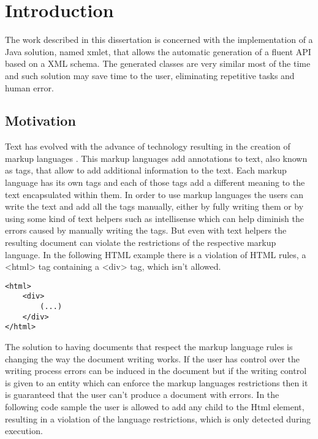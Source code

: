 \chapter{Introduction}
\label{cha:introduction}

The work described in this dissertation is concerned with the implementation of a Java solution, named xmlet, that allows the automatic generation of a fluent API based on a XML schema. The generated classes are very similar most of the time and such solution may save time to the user, eliminating repetitive tasks and human error.

\section{Motivation}


Text has evolved with the advance of technology resulting in the creation of markup languages \cite{markuplanguages}. This markup languages add annotations to text, also known as tags, that allow to add additional information to the text. Each markup language has its own tags and each of those tags add a different meaning to the text encapsulated within them. In order to use markup languages the users can write the text and add all the tags manually, either by fully writing them or by using some kind of text helpers such as intellisense which can help diminish the errors caused by manually writing the tags. But even with text helpers the resulting document can violate the restrictions of the respective markup language. In the following HTML example there is a violation of HTML rules, a <html> tag containing a <div> tag, which isn't allowed.

\newpage

\begin{lstlisting}[caption={Failed HTML rule validation},captionpos=b]
<html>
	<div>
		(...)
	</div>
</html>
\end{lstlisting}

\noindent
The solution to having documents that respect the markup language rules is changing the way the document writing works. If the user has control over the writing process errors can be induced in the document but if the writing control is given to an entity which can enforce the markup languages restrictions then it is guaranteed that the user can't produce a document with errors. In the following code sample the user is allowed to add any child to the Html element, resulting in a violation of the language restrictions, which is only detected during execution.

